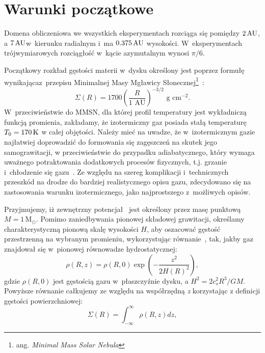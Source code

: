 \section{Warunki początkowe}
Domena obliczeniowa we wszystkich eksperymentach rozciąga się pomiędzy $2\hbox{$\thinspace\textrm{AU}$}$, a
$7\hbox{$\thinspace\textrm{AU}$}$\linebreak w~kierunku radialnym i~ma $0.375\hbox{$\thinspace\textrm{AU}$}$ wysokości. W~eksperymentach
trójwymiarowych rozciągłość w~kącie azymutalnym wynosi $\pi / 6$.
\par Początkowy rozkład gęstości materii w~dysku określony jest poprzez formułę
wynikająca\linebreak z~przepisu Minimalnej Masy Mgławicy Słonecznej\footnote{ang.
\emph{Minimal Mass Solar Nebula}}~\cite{H81}:
\begin{equation}\label{eq:mmsn}
   \Sigma(R) = 1700 \left(\frac{R}{1\textrm{ AU}}\right)^{-3/2} 
   \textrm{ g cm}^{-2}.
\end{equation}
W~przeciwieństwie do MMSN, dla której profil temperatury jest wykładniczą funkcją
promienia, zakładamy, że izotermiczny gaz posiada stałą temperaturę $T_0 = 170\hbox{$\thinspace\textrm{K}$}$
w całej objętości. Należy mieć na uwadze, że w~izotermicznym gazie najłatwiej
doprowadzić do formowania się zagęszczeń na skutek jego samograwitacji, w
przeciwieństwie do przypadku adiabatycznego, który wymaga uważnego potraktowania
dodatkowych procesów fizycznych, t.j. grzanie i~chłodzenie się gazu~\cite{Nel00}.
Ze względu na szereg komplikacji i~technicznych przeszkód na drodze do bardziej
realistycznego opisu gazu, zdecydowano się na zastosowania warunku
izotermicznego, jako najprostszego z~możliwych opisów.
\par Przyjmujemy, iż zewnętrzny potencjał~ jest określony przez
masę punktową $M=1\,\textrm{M}_\odot$. Pomimo zaniedbywania pionowej składowej
grawitacji, określamy charakterystyczną pionową skalę wysokości $H$, aby
oszacować gęstość przestrzenną na wybranym promieniu, wykorzystując
równanie~, tak, jakby gaz znajdował się w~pionowej równowadze
hydrostatycznej:
%
\begin{equation}\label{eq:rhoR}
   \rho(R,z) =  \rho(R,0) \exp\left(-\frac{z^2}{2H(R)^2}\right),
\end{equation}
gdzie $\rho(R,0)$ jest gęstością gazu w~płaszczyźnie dysku, a $H^2 = 2 c_s^2 R^3/
GM$.
%
Powyższe równanie całkujemy ze względu na współrzędną \emph{z} korzystając z
definicji gęstości powierzchniowej:
\begin{equation} \label{eq:sigmaR}
   \Sigma(R) = \int_{-\infty}^\infty \rho(R,z) dz,
\end{equation}
